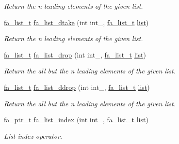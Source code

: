 \begin{DoxyCompactItemize}
\begin{DoxyCompactList}\small\item\em Return the {\itshape n} leading elements of the given list. \end{DoxyCompactList}\item 
\hyperlink{group___fa_list_ga35ecb12ab934ded0cce0bcf28e3bc5d2}{fa\-\_\-list\-\_\-t} \hyperlink{group___fa_list_gae0af29b5201dcd307a8496a9063df5a8}{fa\-\_\-list\-\_\-dtake} (int int\-\_\-, \hyperlink{group___fa_list_ga35ecb12ab934ded0cce0bcf28e3bc5d2}{fa\-\_\-list\-\_\-t} \hyperlink{literals_8h_a4ddd63dfcfec2b4d5741a56aa6003c76}{list})
\begin{DoxyCompactList}\small\item\em Return the {\itshape n} leading elements of the given list. \end{DoxyCompactList}\item 
\hyperlink{group___fa_list_ga35ecb12ab934ded0cce0bcf28e3bc5d2}{fa\-\_\-list\-\_\-t} \hyperlink{group___fa_list_ga0f0d0248dc445bf8fdb7064495f16987}{fa\-\_\-list\-\_\-drop} (int int\-\_\-, \hyperlink{group___fa_list_ga35ecb12ab934ded0cce0bcf28e3bc5d2}{fa\-\_\-list\-\_\-t} \hyperlink{literals_8h_a4ddd63dfcfec2b4d5741a56aa6003c76}{list})
\begin{DoxyCompactList}\small\item\em Return the all but the {\itshape n} leading elements of the given list. \end{DoxyCompactList}\item 
\hyperlink{group___fa_list_ga35ecb12ab934ded0cce0bcf28e3bc5d2}{fa\-\_\-list\-\_\-t} \hyperlink{group___fa_list_ga0141f2e47e17849ca7ff058f321b0d04}{fa\-\_\-list\-\_\-ddrop} (int int\-\_\-, \hyperlink{group___fa_list_ga35ecb12ab934ded0cce0bcf28e3bc5d2}{fa\-\_\-list\-\_\-t} \hyperlink{literals_8h_a4ddd63dfcfec2b4d5741a56aa6003c76}{list})
\begin{DoxyCompactList}\small\item\em Return the all but the {\itshape n} leading elements of the given list. \end{DoxyCompactList}\item 
\hyperlink{group___fa_ga915ddeae99ad7568b273d2b876425197}{fa\-\_\-ptr\-\_\-t} \hyperlink{group___fa_list_gae3a2d1f92391f98bc683bc3c3f8c25ab}{fa\-\_\-list\-\_\-index} (int int\-\_\-, \hyperlink{group___fa_list_ga35ecb12ab934ded0cce0bcf28e3bc5d2}{fa\-\_\-list\-\_\-t} \hyperlink{literals_8h_a4ddd63dfcfec2b4d5741a56aa6003c76}{list})
\begin{DoxyCompactList}\small\item\em List index operator. \end{DoxyCompactList}\item 

\end{DoxyCompactItemize}
